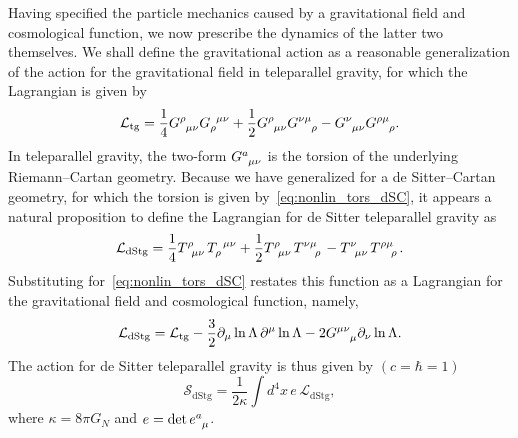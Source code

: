 \documentclass[%
5p,
times,
sort&compress
]{elsarticle}
\newcommand{\ind}{\indices}
\def\pd{\partial}
\def\mc{\mathcal}
\def\mrm{\mathrm}
\begin{document}
Having specified the particle mechanics caused by a gravitational 
field and cosmological function, we now prescribe the dynamics of 
the latter two themselves. We shall define the gravitational 
action as a reasonable generalization of the action for the 
gravitational field in teleparallel gravity, for which the 
Lagrangian is given by~\cite{Maluf:2013gaa}
\begin{equation*}
  \mc{L}_\mrm{tg} = \frac{1}{4} G \ind{^\rho_{\mu\nu}} 
  G\ind{_\rho^{\mu\nu}} + \frac{1}{2} G\ind{^\rho_{\mu\nu}} 
  G\ind{^{\nu\mu}_\rho} - G\ind{^\nu_{\mu\nu}} 
  G\ind{^{\rho\mu}_\rho}.
\end{equation*}
In teleparallel gravity, the two-form $G\ind{^a_{\mu\nu}}$ is the 
torsion of the underlying Riemann--Cartan geometry. Because we 
have generalized for a de Sitter--Cartan geometry, for which the 
torsion is given by~\eqref{eq:nonlin_tors_dSC}, it appears 
a natural proposition to define the Lagrangian for de Sitter 
teleparallel gravity as
\begin{equation*}
  \mc{L}_\mrm{dStg} = \frac{1}{4} T \ind{^\rho_{\mu\nu}} 
  T\ind{_\rho^{\mu\nu}} + \frac{1}{2} T\ind{^\rho_{\mu\nu}} 
  T\ind{^{\nu\mu}_\rho} - T\ind{^\nu_{\mu\nu}} 
  T\ind{^{\rho\mu}_\rho}.
\end{equation*}
Substituting for~\eqref{eq:nonlin_tors_dSC} restates this 
function as a Lagrangian for the gravitational field and 
cosmological function, namely,
\begin{equation}
\label{eq:lagrangian_dStg}
  \mc{L}_\mrm{dStg} = \mc{L}_\mrm{tg} - \frac{3}{2} \pd_\mu \ln 
  \Lambda\, \pd^\mu \ln \Lambda
  - 2 G\ind{^{\mu\nu}_\mu} \pd_\nu \ln \Lambda.
\end{equation}
The action for de Sitter teleparallel gravity is thus given by 
$(c = \hbar = 1)$
\begin{equation}
\label{eq:action_dStg}
  \mc{S}_\mrm{dStg} = \frac{1}{2\kappa} \int d^4 x \, e \, 
  \mc{L}_\mrm{dStg},
\end{equation}
where $\kappa = 8\pi G_N$ and $e = \det e\ind{^a_\mu}$.
\end{document}
